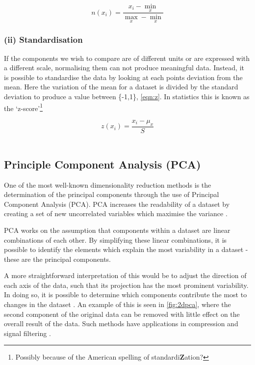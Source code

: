\begin{equation}
    n(x_i) = \frac{x_i - \min_x }{\max_x - \min_x}
    \label{eqn:n}
\end{equation}



\subsubsection*{(ii) Standardisation}
If the components we wish to compare are of different units or are expressed with a different scale, normalising them can not produce meaningful data. Instead, it is possible to standardise the data by looking at each points deviation from the mean. Here the variation of the mean for a dataset is divided by the standard deviation to produce a value between \{-1,1\}, \autoref{eqn:z}. In statistics this is known as the `z-score'\footnote{Possibly because of the American spelling of standardi\textbf{Z}ation?}

\begin{equation}
    z(x_i) = \frac{x_i - \mu_x}{S}
    \label{eqn:z}
\end{equation}\\


\subsection{Principle Component Analysis (PCA)}
One of the most well-known dimensionality reduction methods is the determination of the principal components through the use of Principal Component Analysis (PCA). PCA increases the readability of a dataset by creating a set of new uncorrelated variables which maximise the variance \citep{pcareview}.


 PCA works on the assumption that components within a dataset are linear combinations of each other. By simplifying these linear combinations, it is possible to identify the elements which explain the most variability in a dataset - these are the principal components.

A more straightforward interpretation of this would be to adjust the direction of each axis of the data, such that its projection has the most prominent variability. In doing so, it is possible to determine which components contribute the most to changes in the dataset \citep{pca,pca2}. An example of this is seen in \autoref{fig:2dpca}, where the second component of the original data can be removed with little effect on the overall result of the data. Such methods have applications in compression and signal filtering \citep{pcacompress,pcanoise}.


